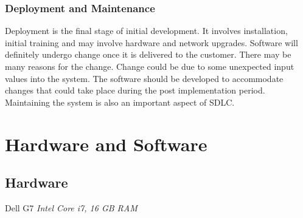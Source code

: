 \documentclass[12pt, a4paper]{report}
\begin{document}
  \subsubsection{Deployment and Maintenance}
  Deployment is the final stage of initial development. It involves installation, initial training and may involve hardware and network upgrades. Software will definitely undergo change once it is delivered to the customer. There may be many reasons for the change. Change could be due to some unexpected input values into the system. The software should be developed to accommodate changes that could take place during the post implementation period. Maintaining the system is also an important aspect of SDLC.
  
  
  \newpage
  \section{Hardware and Software}
    \subsection{Hardware}
    Dell G7\newline
    \emph{Intel Core i7, 16 GB RAM}
    
\end{document}
